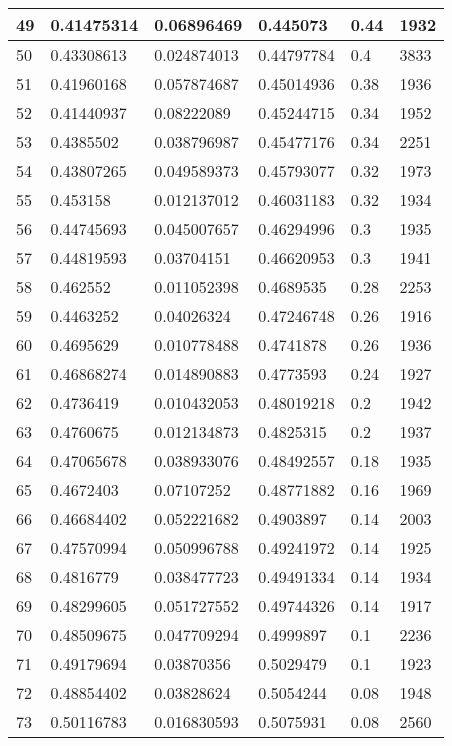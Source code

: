 \begin{longtable}{|l|l|l|l|l|l|}
49 & 0.41475314 & 0.06896469 & 0.445073 & 0.44 & 1932 \\ \hline 
50 & 0.43308613 & 0.024874013 & 0.44797784 & 0.4 & 3833 \\ \hline 
51 & 0.41960168 & 0.057874687 & 0.45014936 & 0.38 & 1936 \\ \hline 
52 & 0.41440937 & 0.08222089 & 0.45244715 & 0.34 & 1952 \\ \hline 
53 & 0.4385502 & 0.038796987 & 0.45477176 & 0.34 & 2251 \\ \hline 
54 & 0.43807265 & 0.049589373 & 0.45793077 & 0.32 & 1973 \\ \hline 
55 & 0.453158 & 0.012137012 & 0.46031183 & 0.32 & 1934 \\ \hline 
56 & 0.44745693 & 0.045007657 & 0.46294996 & 0.3 & 1935 \\ \hline 
57 & 0.44819593 & 0.03704151 & 0.46620953 & 0.3 & 1941 \\ \hline 
58 & 0.462552 & 0.011052398 & 0.4689535 & 0.28 & 2253 \\ \hline 
59 & 0.4463252 & 0.04026324 & 0.47246748 & 0.26 & 1916 \\ \hline 
60 & 0.4695629 & 0.010778488 & 0.4741878 & 0.26 & 1936 \\ \hline 
61 & 0.46868274 & 0.014890883 & 0.4773593 & 0.24 & 1927 \\ \hline 
62 & 0.4736419 & 0.010432053 & 0.48019218 & 0.2 & 1942 \\ \hline 
63 & 0.4760675 & 0.012134873 & 0.4825315 & 0.2 & 1937 \\ \hline 
64 & 0.47065678 & 0.038933076 & 0.48492557 & 0.18 & 1935 \\ \hline 
65 & 0.4672403 & 0.07107252 & 0.48771882 & 0.16 & 1969 \\ \hline 
66 & 0.46684402 & 0.052221682 & 0.4903897 & 0.14 & 2003 \\ \hline 
67 & 0.47570994 & 0.050996788 & 0.49241972 & 0.14 & 1925 \\ \hline 
68 & 0.4816779 & 0.038477723 & 0.49491334 & 0.14 & 1934 \\ \hline 
69 & 0.48299605 & 0.051727552 & 0.49744326 & 0.14 & 1917 \\ \hline 
70 & 0.48509675 & 0.047709294 & 0.4999897 & 0.1 & 2236 \\ \hline 
71 & 0.49179694 & 0.03870356 & 0.5029479 & 0.1 & 1923 \\ \hline 
72 & 0.48854402 & 0.03828624 & 0.5054244 & 0.08 & 1948 \\ \hline 
73 & 0.50116783 & 0.016830593 & 0.5075931 & 0.08 & 2560 \\ \hline 

\end{longtable}

